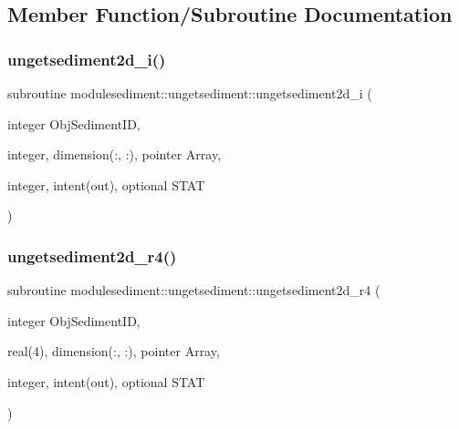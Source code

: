 \subsection{Member Function/\+Subroutine Documentation}
\mbox{\label{interfacemodulesediment_1_1ungetsediment_a04acf8ef87a03c303770a48021c0a2d7}} 
\subsubsection{\texorpdfstring{ungetsediment2d\+\_\+i()}{ungetsediment2d\_i()}}
{\footnotesize\ttfamily subroutine modulesediment\+::ungetsediment\+::ungetsediment2d\+\_\+i (\begin{DoxyParamCaption}\item[{integer}]{Obj\+Sediment\+ID,  }\item[{integer, dimension(\+:, \+:), pointer}]{Array,  }\item[{integer, intent(out), optional}]{S\+T\+AT }\end{DoxyParamCaption})\hspace{0.3cm}{\ttfamily [private]}}

\mbox{\label{interfacemodulesediment_1_1ungetsediment_a00c6698e7f14a43dfe57336b399972cf}} 
\subsubsection{\texorpdfstring{ungetsediment2d\+\_\+r4()}{ungetsediment2d\_r4()}}
{\footnotesize\ttfamily subroutine modulesediment\+::ungetsediment\+::ungetsediment2d\+\_\+r4 (\begin{DoxyParamCaption}\item[{integer}]{Obj\+Sediment\+ID,  }\item[{real(4), dimension(\+:, \+:), pointer}]{Array,  }\item[{integer, intent(out), optional}]{S\+T\+AT }\end{DoxyParamCaption})\hspace{0.3cm}{\ttfamily [private]}}

